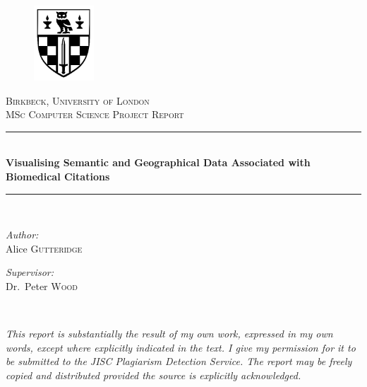 \documentclass[Report.tex]{subfiles}
\newcommand{\HRule}{\rule{\linewidth}{0.5mm}}
\begin{document}
\thispagestyle{empty}

\begin{center}
\begin{figure}[!ht]
\begin{center}
	\includegraphics[width=0.2\textwidth]{../lib/images/shield}
\end{center}
\end{figure}

\textsc{\LARGE Birkbeck, University of London}\\[1.5cm]

\textsc{\Large MSc Computer Science Project Report}\\[0.5cm]

\HRule \\[0.4cm]
{ \huge \bfseries Visualising Semantic and Geographical Data Associated with Biomedical Citations\\[0.4cm] }

\HRule \\[1.5cm]

\noindent
\begin{minipage}[t]{0.4\textwidth}
\begin{flushleft} \large
\emph{Author:}\\
Alice \textsc{Gutteridge}
\end{flushleft}
\end{minipage}%
\begin{minipage}[t]{0.4\textwidth}
\begin{flushright} \large
\emph{Supervisor:} \\
Dr.~Peter \textsc{Wood}
\end{flushright}
\end{minipage}\\

\vfill

\emph{This report is substantially the result of my own work, expressed in my own words, except where explicitly indicated in the text. I give my permission for it to be submitted to the JISC Plagiarism Detection Service. The report may be freely copied and distributed provided the source is explicitly acknowledged.}

\end{center}
\end{document}
